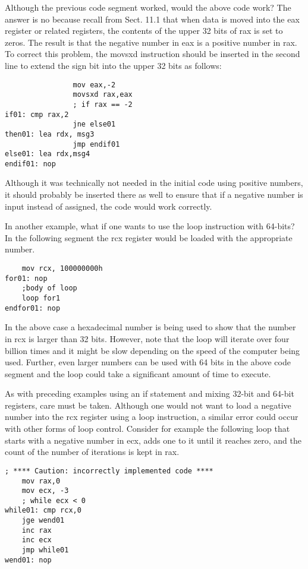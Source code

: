 \documentclass[10pt]{article}
\begin{document}
Although the previous code segment worked, would the above code work? The answer is no because recall from Sect. 11.1 that when data is moved into the eax register or related registers, the contents of the upper 32 bits of rax is set to zeros. The result is that the negative number in eax is a positive number in rax. To correct this problem, the movsxd instruction should be inserted in the second line to extend the sign bit into the upper 32 bits as follows:

\begin{verbatim}
                mov eax,-2
                movsxd rax,eax
                ; if rax == -2
if01: cmp rax,2
                jne else01
then01: lea rdx, msg3
                jmp endif01
else01: lea rdx,msg4
endif01: nop
\end{verbatim}

Although it was technically not needed in the initial code using positive numbers, it should probably be inserted there as well to ensure that if a negative number is input instead of assigned, the code would work correctly.

In another example, what if one wants to use the loop instruction with 64-bits? In the following segment the rcx register would be loaded with the appropriate number.

\begin{verbatim}
    mov rcx, 100000000h
for01: nop
    ;body of loop
    loop for1
endfor01: nop
\end{verbatim}

In the above case a hexadecimal number is being used to show that the number in rcx is larger than 32 bits. However, note that the loop will iterate over four billion times and it might be slow depending on the speed of the computer being used. Further, even larger numbers can be used with 64 bits in the above code segment and the loop could take a significant amount of time to execute.

As with preceding examples using an if statement and mixing 32-bit and 64-bit registers, care must be taken. Although one would not want to load a negative number into the rcx register using a loop instruction, a similar error could occur with other forms of loop control. Consider for example the following loop that starts with a negative number in ecx, adds one to it until it reaches zero, and the count of the number of iterations is kept in rax.

\begin{verbatim}
; **** Caution: incorrectly implemented code ****
    mov rax,0
    mov ecx, -3
    ; while ecx < 0
while01: cmp rcx,0
    jge wend01
    inc rax
    inc ecx
    jmp while01
wend01: nop
\end{verbatim}
\end{document}
